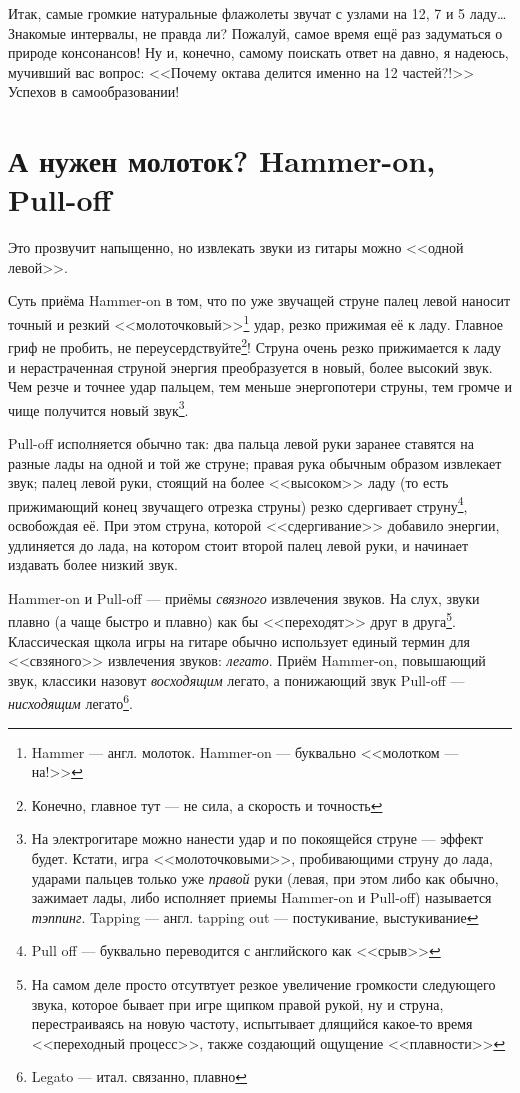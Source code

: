 Итак, самые громкие натуральные флажолеты звучат с узлами на 12, 7 и 5 ладу\ldots Знакомые интервалы, не правда ли? Пожалуй, самое время ещё раз задуматься о природе консонансов! Ну и, конечно, самому поискать ответ на давно, я надеюсь, мучивший вас вопрос: <<Почему октава делится именно на 12 частей?!>> Успехов в самообразовании!


\section{А нужен молоток? Hammer-on, Pull-off}

Это прозвучит напыщенно, но извлекать звуки из гитары можно <<одной левой>>.

Суть приёма Hammer-on в том, что по уже звучащей струне палец левой наносит точный и резкий <<молоточковый>>\footnote{Hammer --- англ. молоток. Hammer-on --- буквально <<молотком --- на!>>} удар, резко прижимая её к ладу. Главное гриф не пробить, не переусердствуйте\footnote{Конечно, главное тут --- не сила, а скорость и точность}! Струна очень резко прижимается к ладу и нерастраченная струной энергия преобразуется в новый, более высокий звук. Чем резче и точнее удар пальцем, тем меньше энергопотери струны, тем громче и чище получится новый звук\footnote{На электрогитаре можно нанести удар и по покоящейся струне --- эффект будет. Кстати, игра <<молоточковыми>>, пробивающими струну до лада, ударами пальцев только уже \emph{правой} руки (левая, при этом либо как обычно, зажимает лады, либо исполняет приемы Hammer-on и Pull-off) называется \emph{тэппинг}. Tapping --- англ. tapping out --- постукивание, выстукивание}.

Pull-off исполняется обычно так: два пальца левой руки заранее ставятся на разные лады на одной и той же струне; правая рука обычным образом извлекает звук; палец левой руки, стоящий на более <<высоком>> ладу (то есть прижимающий конец звучащего отрезка струны) резко сдергивает струну\footnote{Pull off --- буквально переводится с английского как <<срыв>>}, освобождая её. При этом струна, которой <<сдергивание>> добавило энергии, удлиняется до лада, на котором стоит второй палец левой руки, и начинает издавать более низкий звук.

Hammer-on и Pull-off --- приёмы \emph{связного} извлечения звуков. На слух, звуки плавно (а чаще быстро и плавно) как бы <<переходят>> друг в друга\footnote{На самом деле просто отсутвтует резкое увеличение громкости следующего звука, которое бывает при игре щипком правой рукой, ну и струна, перестраиваясь на новую частоту, испытывает длящийся какое-то время <<переходный процесс>>, также создающий ощущение <<плавности>>}. Классическая щкола игры на гитаре обычно использует единый термин для <<свзяного>> извлечения звуков: \emph{легато}. Приём Hammer-on, повышающий звук, классики назовут \emph{восходящим} легато, а понижающий звук Pull-off --- \emph{нисходящим} легато\footnote{Legato --- итал. связанно, плавно}. 

